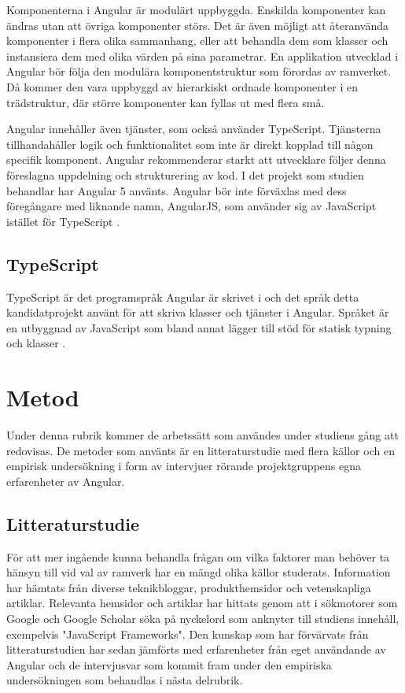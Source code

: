Komponenterna i Angular är modulärt uppbyggda. Enskilda komponenter kan ändras utan att övriga komponenter störs. Det är även möjligt att återanvända komponenter i flera olika sammanhang, eller att behandla dem som klasser och instansiera dem med olika värden på sina parametrar. En applikation utvecklad i Angular bör följa den modulära komponentstruktur som förordas av ramverket. Då kommer den vara uppbyggd av hierarkiskt ordnade komponenter i en trädstruktur, där större komponenter kan fyllas ut med flera små.   

Angular innehåller även tjänster, som också använder TypeScript. Tjänsterna tillhandahåller logik och funktionalitet som inte är direkt kopplad till någon specifik komponent. Angular rekommenderar starkt att utvecklare följer denna föreslagna uppdelning och strukturering av kod. I det projekt som studien behandlar har Angular 5 använts. Angular bör inte förväxlas med dess föregångare med liknande namn, AngularJS, som använder sig av JavaScript istället för TypeScript \cite{angularguide}.


\subsection{TypeScript}

TypeScript är det programspråk Angular är skrivet i och det språk detta kandidatprojekt använt för att skriva klasser och tjänster i Angular. Språket är en utbyggnad av JavaScript som bland annat lägger till stöd för statisk typning och klasser \cite{henrik_ts1}.


\section{Metod}

Under denna rubrik kommer de arbetssätt som användes under studiens gång att redovisas. De metoder som använts är en litteraturstudie med flera källor och en empirisk undersökning i form av intervjuer rörande projektgruppens egna erfarenheter av Angular.

\subsection{Litteraturstudie}

För att mer ingående kunna behandla frågan om vilka faktorer man behöver ta hänsyn till vid val av ramverk har en mängd olika källor studerats. Information har hämtats från diverse teknikbloggar, produkthemsidor och vetenskapliga artiklar. Relevanta hemsidor och artiklar har hittats genom att i sökmotorer som Google \cite{google} och Google Scholar \cite{scholar} söka på nyckelord som anknyter till studiens innehåll, exempelvis "JavaScript Frameworks".  Den kunskap som har förvärvats från litteraturstudien har sedan jämförts med erfarenheter från eget användande av Angular och de intervjusvar som kommit fram under den empiriska undersökningen som behandlas i nästa delrubrik.


